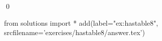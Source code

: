 
\begin{ex} 
  \label{ex:hastable8}
  
  \qed
\end{ex} 
\begin{python0}
from solutions import *
add(label="ex:hastable8",
    srcfilename='exercises/hastable8/answer.tex') 
\end{python0}
